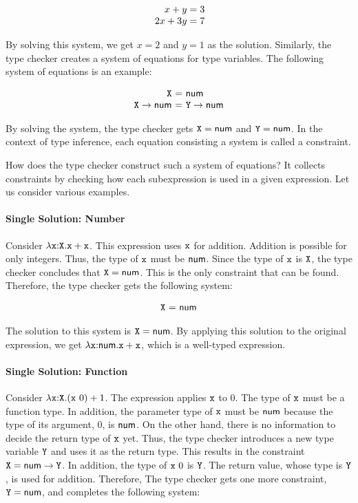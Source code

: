 \[
\begin{array}{r@{~}c@{~}l}
  x + y = 3 \\
  2x + 3y = 7
\end{array}
\]

By solving this system, we get $x=2$ and $y=1$ as the solution. Similarly, the
type checker creates a system of equations for type variables. The following
system of equations is an example:

\[
\begin{array}{r@{~}c@{~}l}
  \cX &=& \tnum \\
  \tarrow{\cX}{\tnum} &=& \tarrow{\cY}{\tnum}
\end{array}
\]

By solving the system, the type checker gets $\texttt{X}=\textsf{num}$ and $\texttt{Y}=\textsf{num}$.
In the context of type inference, each equation consisting a system is called
a constraint.

How does the type checker construct such a system of equations? It collects
constraints by checking how each subexpression is used in a given expression.
Let us consider various examples.

\paragraph{Single Solution: Number}

Consider $\lambda\texttt{x}{:}\texttt{X}.\texttt{x}+\texttt{x}$. This expression uses $\texttt{x}$ for
addition. Addition is possible for only integers. Thus, the type of $\texttt{x}$ must
be $\textsf{num}$. Since the type of $\texttt{x}$ is $\texttt{X}$, the type checker concludes that
$\texttt{X}=\textsf{num}$. This is the only constraint that can be found.  Therefore, the type
checker gets the following system:

\[
\begin{array}{r@{~}c@{~}l}
  \cX &=& \tnum \\
\end{array}
\]

The solution to this system is $\texttt{X}=\textsf{num}$. By applying this solution to the
original expression, we get $\lambda\texttt{x}{:}\textsf{num}.\texttt{x}+\texttt{x}$, which is a
well-typed \plang expression.

\paragraph{Single Solution: Function}

Consider $\lambda\texttt{x}{:}\texttt{X}.(\texttt{x}\ 0)+1$. The expression applies
$\texttt{x}$ to $0$. The type of $\texttt{x}$ must be a function type. In addition, the
parameter type of $\texttt{x}$ must be $\textsf{num}$ because the type of its argument, $0$,
is $\textsf{num}$. On the other hand, there is no information to decide the return type
of $\texttt{x}$ yet. Thus, the type checker introduces a new type variable $\texttt{Y}$ and
uses it as the return type. This results in the constraint
$\texttt{X}=\textsf{num}\rightarrow\texttt{Y}$. In addition, the type of $\texttt{x}\ 0$ is $\texttt{Y}$.
The return value, whose type is $\texttt{Y}$, is used for addition. Therefore, The type
checker gets one more constraint, $\texttt{Y}=\textsf{num}$, and completes the following
system:


